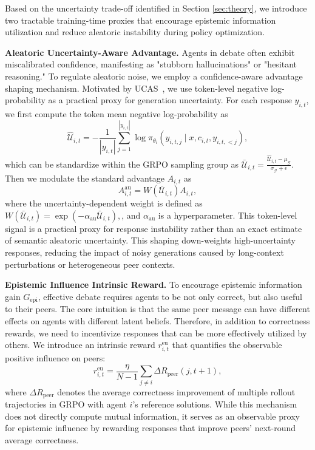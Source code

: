 \documentclass{article}
\theoremstyle{plain}
\theoremstyle{definition}
\theoremstyle{remark}
\begin{document}
Based on the uncertainty trade-off identified in Section \ref{sec:theory}, we introduce two tractable training-time proxies that encourage epistemic information utilization and reduce aleatoric instability during policy optimization.




\textbf{Aleatoric Uncertainty-Aware Advantage.} Agents in debate often exhibit miscalibrated confidence, manifesting as "stubborn hallucinations" or "hesitant reasoning." To regulate aleatoric noise, we employ a confidence-aware advantage shaping mechanism. Motivated by UCAS~\cite{xie2025unlocking}, we use token-level negative log-probability as a practical proxy for generation uncertainty. For each response $y_{i,t}$, we first compute the token mean negative log-probability as
\begin{equation*}
\hat{\mathcal{U}}_{i,t}
=
-\frac{1}{|y_{i,t}|}
\sum_{j=1}^{|y_{i,t}|}
\log \pi_{\theta_i}(y_{i,t,j}\mid x,c_{i,t},y_{i,t,<j}),
\end{equation*}
which can be standardize within the GRPO sampling group as $
\bar{\mathcal{U}}_{i,t}
=
\frac{\hat{\mathcal{U}}_{i,t}-\mu_{\mathcal{G}}}{\sigma_{\mathcal{G}}+\epsilon}.$ Then we modulate the standard advantage $A_{i,t}$ as
\begin{equation}
A^{\mathrm{au}}_{i,t}
=
W(\bar{\mathcal{U}}_{i,t}) A_{i,t},
\end{equation}
where the uncertainty-dependent weight is defined as
$W(\bar{\mathcal{U}}_{i,t})
=
\exp(-\alpha_{\mathrm{au}}\bar{\mathcal{U}}_{i,t}),
$, and $\alpha_{\mathrm{au}}$ is a hyperparameter. This token-level signal is a practical proxy for response instability rather than an exact estimate of semantic aleatoric uncertainty. This shaping down-weights high-uncertainty responses, reducing the impact of noisy generations caused by long-context perturbations or heterogeneous peer contexts.





\textbf{Epistemic Influence Intrinsic Reward.} To encourage epistemic information gain $G_{\text{epi}}$, effective debate requires agents to be not only correct, but also useful to their peers. The core intuition is that the same peer message can have different effects on agents with different latent beliefs. Therefore, in addition to correctness rewards, we need to incentivize responses that can be more effectively utilized by others. We introduce an intrinsic reward $r^{\text{eu}}_{i,t}$ that quantifies the observable positive influence on peers: 
\begin{equation} r^{\text{eu}}_{i,t} = \frac{\eta}{N-1} \sum_{j \neq i} \Delta R_{\text{peer}}(j, t+1), \end{equation} 
where $\Delta R_{\text{peer}}$ denotes the average correctness improvement of multiple rollout trajectories in GRPO with agent $i$'s reference solutions. While this mechanism does not directly compute mutual information, it serves as an observable proxy for epistemic influence by rewarding responses that improve peers' next-round average correctness.
\end{document}
